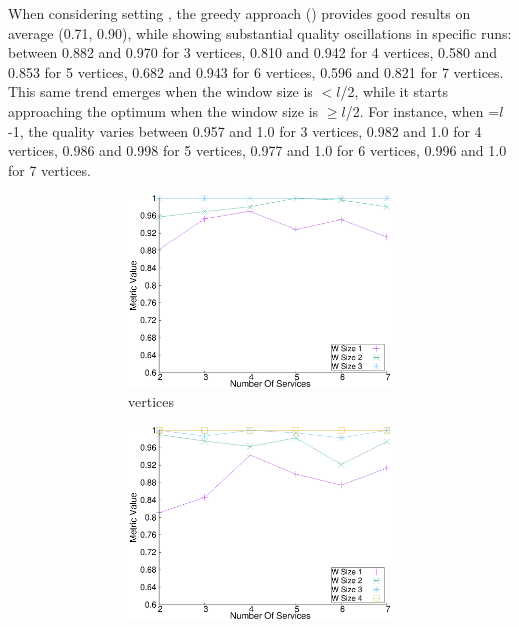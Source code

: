   When considering setting \wide, the greedy approach () provides good results on average (0.71, 0.90), while showing substantial quality oscillations in specific runs: between 0.882 and 0.970 for 3 vertices, 0.810 and 0.942 for 4 vertices, 0.580 and 0.853 for 5 vertices, 0.682 and 0.943 for 6 vertices, 0.596 and 0.821 for 7 vertices. This same trend emerges when the window size is $<$$l$/2, while it starts approaching the optimum when the window size is $\geq$$l$/2. For instance, when \windowsize=$l$-1, the quality varies between 0.957 and 1.0 for 3 vertices, 0.982 and 1.0 for 4 vertices, 0.986 and 0.998 for 5 vertices, 0.977 and 1.0 for 6 vertices, 0.996 and 1.0 for 7 vertices.

  \begin{figure}[H]
    \centering
    \begin{adjustbox}{minipage=\linewidth,scale=0.75}
      \begin{subfigure}{0.45\textwidth}
    \begin{subfigure}{\textwidth}
      \includegraphics[width=\textwidth]{Images/graphs/window_quality_performance_diff_perce_n7_s7_20_100_n3}
      \caption{ vertices}
      \label{fig:quality_window_wide_perce_n3}
    \end{subfigure}
    \begin{subfigure}{\textwidth}
      \includegraphics[width=\textwidth]{Images/graphs/window_quality_performance_diff_perce_n7_s7_20_100_n4}

\end{subfigure}
\end{subfigure}
\end{adjustbox}
\end{figure}
